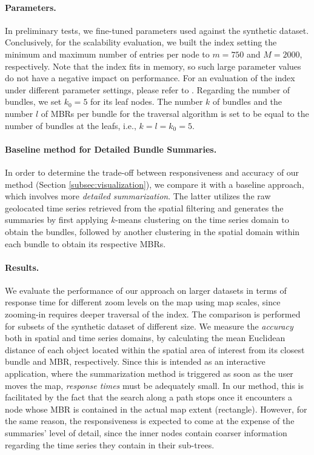 \paragraph{Parameters.} In preliminary tests, we fine-tuned parameters used against the synthetic dataset. Conclusively, for the scalability evaluation, we built the \btsr index setting the minimum and maximum number of entries per node to $m=750$ and $M=2000$, respectively. Note that the index fits in memory, so such large parameter values do not have a negative impact on performance. For an evaluation of the \btsr index under different parameter settings, please refer to \cite{chatzig17btsr}. Regarding the number of bundles, we set $k_0 = 5$ for its leaf nodes. The number $k$ of bundles and the number $l$ of MBRs per bundle for the traversal algorithm is set to be equal to the number of bundles at the leafs, i.e., $k = l = k_0 = 5$.

\paragraph{Baseline method for Detailed Bundle Summaries.} In order to determine the trade-off between responsiveness and accuracy of our method (Section \ref{subsec:visualization}), we compare it with a baseline approach, which involves more {\em detailed summarization}. The latter utilizes the raw geolocated time series retrieved from the spatial filtering and generates the summaries by first applying $k$-means clustering on the time series domain to obtain the bundles, followed by another clustering in the spatial domain within each bundle to obtain its respective MBRs. 

\paragraph{Results.} We evaluate the performance of our approach on larger datasets in terms of response time for different zoom levels on the map using map scales, since zooming-in requires deeper traversal of the \btsr index. The comparison is performed for subsets of the synthetic dataset of different size. We measure the {\em accuracy} both in spatial and time series domains, by calculating the mean Euclidean distance of each object located within the spatial area of interest from its closest bundle and MBR, respectively. Since this is intended as an interactive application, where the summarization method is triggered as soon as the user moves the map, {\em response times} must be adequately small. In our method, this is facilitated by the fact that the search along a path stops once it encounters a node whose MBR is contained in the actual map extent (rectangle). However, for the same reason, the responsiveness is expected to come at the expense of the summaries' level of detail, since the inner nodes contain coarser information regarding the time series they contain in their sub-trees.


